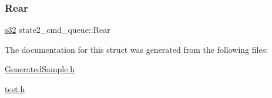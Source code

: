 \mbox{\label{structstate2__cmd__queue_a3417bc9526018e0f80aafdf292491ab0}} 
\subsubsection{\texorpdfstring{Rear}{Rear}}
{\footnotesize\ttfamily \hyperlink{ab__common_8h_ae9b1af5c037e57a98884758875d3a7c4}{s32} state2\+\_\+cmd\+\_\+queue\+::\+Rear}



The documentation for this struct was generated from the following files\+:\begin{DoxyCompactItemize}
\item 
\hyperlink{GeneratedSample_8h}{Generated\+Sample.\+h}\item 
\hyperlink{test_8h}{test.\+h}\end{DoxyCompactItemize}
